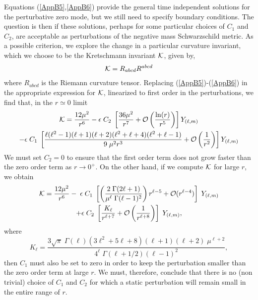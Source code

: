 \documentclass[12pt,aps,floats,showpacs,amssymb,tightenlines]{revtex4}
\newcommand{\m}{\mu}
\begin{document}
Equations (\ref{AppB5},\ref{AppB6}) provide the general time
independent solutions for the perturbative zero mode, but we still
need to specify boundary conditions. The question is then if these
solutions, perhaps for some particular choices of $C_1$ and $C_2$,
are acceptable as perturbations of the negative mass Schwarzschild
metric. As a possible criterion, we explore the change in a
particular curvature invariant, which we choose
 to be the Kretschmann invariant ${\cal{K}}$, given by,
\begin{equation}
\label{RW9} {\cal{K}} = R_{abcd} R^{abcd}
\end{equation}
where $R_{abcd}$ is the Riemann curvature tensor. Replacing
(\ref{AppB5})-(\ref{AppB6}) in the appropriate expression for
${\cal{K}}$, linearized to
 first order in the perturbations, we find that, in the $r \simeq 0$
 limit
\begin{multline}
\label{Kcerca} {\cal{K}} = \frac{12 \m^2}{r^6} - \epsilon \; C_2 \;
\left[  \frac{36 \m^2}{r^7}  + {\cal O} \left( \frac{\ln(r) }{r^5}
\right) \right] Y_{(\ell,m)}
\\ - \epsilon \; C_1 \;\left[ \frac{\ell (\ell ^2-1) (\ell +1)
(\ell+2)(\ell ^2+\ell +4)(\ell ^2+\ell-1)}{ 9 \; \m^2 r^3} + {\cal
O} \left( \frac{1}{r^2} \right)\right] Y_{(\ell,m)}
\end{multline}
 We must set $C_2=0$ to ensure that the first order term
does not grow faster than the zero order term as $r \to 0^{+}$. On
the other hand, if we  compute ${\cal{K}}$ for large $r$,  we obtain
\begin{multline}
\label{Klejos} {\cal{K}} = \frac {12 \mu^2} {{r}^{6}} -  \; \epsilon
\; C_1 \; \left[ \left( \frac{2 \; \Gamma (2 \ell +1)}{\mu^{\ell} \;
\Gamma (\ell-1)^2} \right) r^{\ell-5} +  {\cal O} (r^{\ell-4})
\right] \; Y_{(\ell,m)} \\
+ \epsilon \; C_2 \; \left[ \frac{K_{\ell}}{ r^{\ell+7}} +  {\cal O}
\left( \frac{1}{r^{\ell+8}} \right) \right] \; Y_{(\ell,m)},
\end{multline}
where
\begin{equation}
K_{\ell} = \frac{3 \sqrt{\pi} \; \Gamma(\ell)  (3 \ell^2+5 \ell
+8)(\ell+1)(\ell+2) \;\m^{\ell +2}}{ 4^{\ell} \; \Gamma(\ell +1/2)
(\ell-1)^2},
\end{equation}
then $C_1$ must also be set to zero in order to keep the
perturbation smaller than the zero order term  at large $r$.
 We must, therefore, conclude that there is
no (non trivial) choice of $C_1$ and $C_2$ for which a static
 perturbation will remain small in the entire range of $r$.\\
\end{document}
